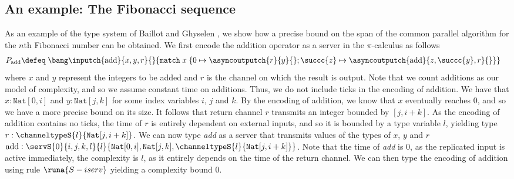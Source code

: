 \subsection{An example: The Fibonacci sequence}\label{sec:b&gexample}
As an example of the type system of Baillot and Ghyselen \cite{BaillotGhyselen2021}, we show how a precise bound on the span of the common parallel algorithm for the $n$th Fibonacci number can be obtained. We first encode the addition operator as a server in the $\pi$-calculus as follows
\begin{align*}
    P_\text{add}\defeq&\;\bang\inputch{\text{add}}{x,y,r}{}{
        \texttt{match}\; x\; \{
             0 \mapsto \asyncoutputch{r}{y}{};
            \succc{z} \mapsto \asyncoutputch{\text{add}}{z,\succc{y},r}{}\}}
\end{align*}
where $x$ and $y$ represent the integers to be added and $r$ is the channel on which the result is output. Note that we count additions as our model of complexity, and so we assume constant time on additions. Thus, we do not include ticks in the encoding of addition. We have that $x : \texttt{Nat}[0,i]$ and $y : \texttt{Nat}[j,k]$ for some index variables $i$, $j$ and $k$. By the encoding of addition, we know that $x$ eventually reaches 0, and so we have a more precise bound on its size. It follows that return channel $r$ transmits an integer bounded by $[j,i+k]$. As the encoding of addition contains no ticks, the time of $r$ is entirely dependent on external inputs, and so it is bounded by a type variable $l$, yielding type $r : \channeltypeS{l}{\texttt{Nat}[j,i+k]}$. We can now type \textit{add} as a server that transmits values of the types of $x$, $y$ and $r$ $\text{add} : \servS{0}{i,j,k,l}{l}{\texttt{Nat}[0,i],\texttt{Nat}[j,k],\channeltypeS{l}{\texttt{Nat}[j,i+k]}}$. Note that the time of \textit{add} is 0, as the replicated input is active immediately, the complexity is $l$, as it entirely depends on the time of the return channel. We can then type the encoding of addition using rule $\runa{S-iserv}$ yielding a complexity bound 0.\\

